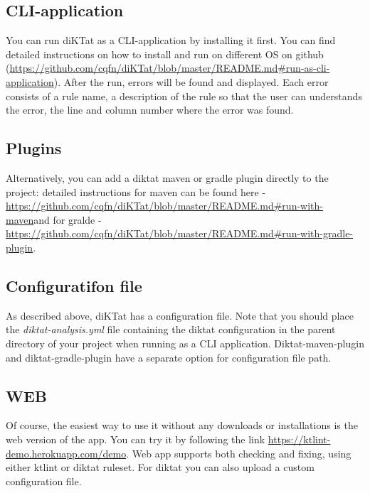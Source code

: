 \subsection{CLI-application}
\par You can run diKTat as a CLI-application by installing it first. You can find detailed instructions on how to install and run on different OS on github (\url{https://github.com/cqfn/diKTat/blob/master/README.md#run-as-cli-application}). After the run, errors will be found and displayed. Each error consists of a rule name, a description of the rule so that the user can understands the error, the line and column number where the error was found.\\
\subsection{Plugins}
\par Alternatively, you can add a diktat maven or gradle plugin directly to the project: detailed instructions for maven can be found here - \url{https://github.com/cqfn/diKTat/blob/master/README.md#run-with-maven}and for gralde - \url{https://github.com/cqfn/diKTat/blob/master/README.md#run-with-gradle-plugin}.\\
\subsection{Configuratifon file}
As described above, diKTat has a configuration file. Note that you should place the \textsl{diktat-analysis.yml} file containing the diktat configuration in the parent directory of your project when running as a CLI application. Diktat-maven-plugin and diktat-gradle-plugin have a separate option for configuration file path.
\subsection{WEB}
\par Of course, the easiest way to use it without any downloads or installations is the web version of the app. You can try it by following the link \url{https://ktlint-demo.herokuapp.com/demo}. Web app supports both checking and fixing, using either ktlint or diktat ruleset. For diktat you can also upload a custom configuration file.
